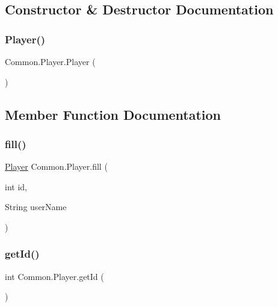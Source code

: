 \subsection{Constructor \& Destructor Documentation}
\mbox{\label{classCommon_1_1Player_a41dd3f4886d9e2a500c11be33ee73037}} 
\subsubsection{\texorpdfstring{Player()}{Player()}}
{\footnotesize\ttfamily Common.\+Player.\+Player (\begin{DoxyParamCaption}{ }\end{DoxyParamCaption})\hspace{0.3cm}{\ttfamily [inline]}}



\subsection{Member Function Documentation}
\mbox{\label{classCommon_1_1Player_a210c67d034b0b8ed9ead15c78a160829}} 
\subsubsection{\texorpdfstring{fill()}{fill()}}
{\footnotesize\ttfamily \mbox{\hyperlink{classCommon_1_1Player}{Player}} Common.\+Player.\+fill (\begin{DoxyParamCaption}\item[{int}]{id,  }\item[{String}]{user\+Name }\end{DoxyParamCaption})\hspace{0.3cm}{\ttfamily [inline]}}

\mbox{\label{classCommon_1_1Player_a713d057ef14b76119f3dfadc144ba150}} 
\subsubsection{\texorpdfstring{get\+Id()}{getId()}}
{\footnotesize\ttfamily int Common.\+Player.\+get\+Id (\begin{DoxyParamCaption}{ }\end{DoxyParamCaption})\hspace{0.3cm}{\ttfamily [inline]}}

